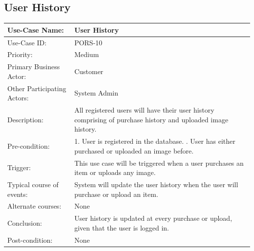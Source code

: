 \subsection{User History}
\begin{center}
    \begin{tabular}{ @{}|p{7cm}||p{7cm}|  }
    \hline
    Use-Case Name: & User History \\ \hline
    Use-Case ID: & PORS-10\\ \hline
    Priority: & Medium \\ \hline
    Primary Business Actor: & Customer \\ \hline
    Other Participating Actors: & System Admin \\ \hline
    Description: & All registered users will have their user history comprising of purchase history and uploaded image history. \\ \hline
    Pre-condition: & 1.	User is registered in the database. \newline 2. User has either purchased or uploaded an image before.
 \\ \hline
    Trigger: & This use case will be triggered when a user purchases an item or uploads any image. \\ \hline
    Typical course of events: &  System will update the user history when the user will purchase or upload an item.\\ \hline
    Alternate courses: & None\\ \hline
    Conclusion: & User history is updated at every purchase or upload, given that the user is logged in.\\ \hline
    Post-condition: &  None\\ \hline
    \end{tabular}
\end{center}

